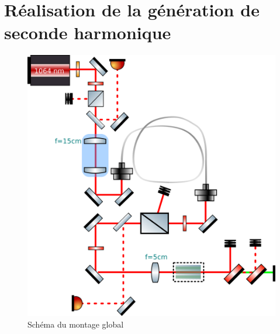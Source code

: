 \documentclass[11pt,a4paper]{article}
\begin{document}
\section{Réalisation de la génération de seconde harmonique}
\begin{figure}[h]
	\centering
	\includegraphics{./img/schema global.png}
	\caption{Schéma du montage global}
	\label{fig:global}
\end{figure}
\end{document}
